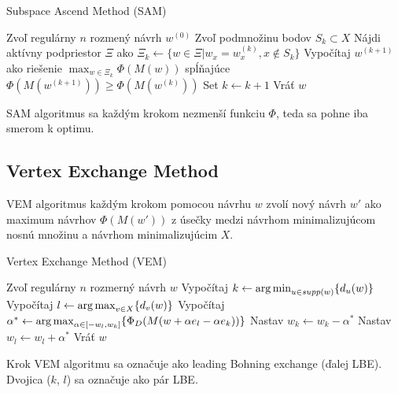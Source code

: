 \begin{algorithm}[H]
	\caption{Subspace Ascend Method (SAM) \cite{rex_harman}}
	\label{sam}
	\begin{algorithmic}[1]
		\State Zvoľ regulárny $n$ rozmený návrh $w^{(0)}$
			\State Zvoľ podmnožinu bodov $S_k \subset X$
			\State Nájdi aktívny podpriestor $\Xi$ ako $\Xi_k \leftarrow \{ w \in \Xi | w_x = w_x^{(k)}, x \not \in S_k \}$
			\State Vypočítaj $w^{(k+1)}$ ako riešenie $\max_{w \in \Xi_k} \Phi(M(w))$ spĺňajúce $\Phi(M(w^{(k+1)})) \geq \Phi(M(w^{(k)}))$
			\State Set $k \leftarrow k+1$
		\EndWhile
		\State Vráť $w$
	\end{algorithmic}
\end{algorithm}

SAM algoritmus sa každým krokom nezmenší funkciu $\Phi$, teda sa pohne iba smerom k optimu.

\subsection{Vertex Exchange Method}

VEM algoritmus každým krokom pomocou návrhu $w$ zvolí nový návrh $w'$ ako maximum návrhov $\Phi(M(w'))$ z úsečky medzi návrhom minimalizujúcom nosnú množinu a návrhom minimalizujúcim $X$.

\begin{algorithm}[H]
	\caption{Vertex Exchange Method (VEM) \cite{rex_harman}}
	\label{vem}
	\begin{algorithmic}[1]
		\State Zvoľ regulárny $n$ rozmerný návrh $w$
			\State Vypočítaj $k \leftarrow \operatorname*{arg\,min}_{u \in supp(w)} \{ d_u(w)\}$
			\State Vypočítaj $l \leftarrow \operatorname*{arg\,max}_{v \in X} \{ d_v(w)\}$
			\State Vypočítaj $\alpha^* \leftarrow \operatorname*{arg\,max}_{\alpha \in [-w_l, w_k]} \{ \Phi_D (M(w+\alpha e_l -\alpha e_k))\}$
			\State Nastav $w_k \leftarrow w_k - \alpha^*$
			\State Nastav $w_l \leftarrow w_l + \alpha^*$
		\EndWhile
		\State Vráť $w$
	\end{algorithmic}
\end{algorithm}

Krok VEM algoritmu sa označuje ako leading Bohning exchange (ďalej LBE). Dvojica ($k$, $l$) sa označuje ako pár LBE.

